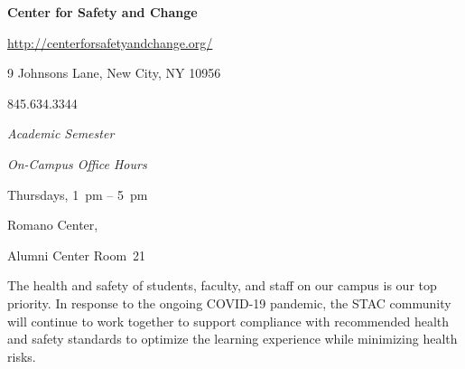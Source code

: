 \documentclass[11pt,letterpaper]{article}
\begin{document}
\begin{itemize}
        \begin{center}
        \begin{minipage}[t]{0.50\textwidth} 
	{\bfseries Center for Safety and Change} \par
	\url{http://centerforsafetyandchange.org/} \par
	9 Johnsons Lane, New City, NY 10956 \par
	845.634.3344 \par \vspace{0.3cm} 
	\hspace{1cm} {\itshape Academic Semester} \par
	\hspace{0.5cm} {\itshape On-Campus Office Hours} \par\vspace{0.1cm}
	\hspace{0.5cm} Thursdays, 1~pm -- 5~pm \par
	\hspace{0.5cm} Romano Center, \par
	\hspace{0.5cm} Alumni Center Room~21
        \end{minipage} 
        \end{center}
\end{itemize} \sectionbreak





The health and safety of students, faculty, and staff on our campus is our top priority. In response to the ongoing COVID-19 pandemic, the STAC community will continue to work together to support compliance with recommended health and safety standards to optimize the learning experience while minimizing health risks.   
\end{document}
